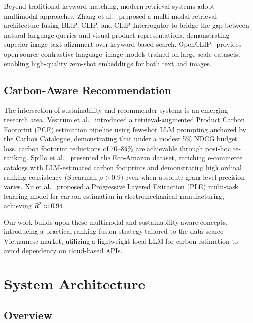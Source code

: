 \documentclass[conference]{IEEEtran}
\begin{document}
Beyond traditional keyword matching, modern retrieval systems adopt multimodal approaches. Zhang et al.~\cite{paper5} proposed a multi-modal retrieval architecture fusing BLIP, CLIP, and CLIP Interrogator to bridge the gap between natural language queries and visual product representations, demonstrating superior image-text alignment over keyword-based search. OpenCLIP~\cite{openclip} provides open-source contrastive language--image models trained on large-scale datasets, enabling high-quality zero-shot embeddings for both text and images.

\subsection{Carbon-Aware Recommendation}

The intersection of sustainability and recommender systems is an emerging research area. Vestrum et al.~\cite{carbon_reranking} introduced a retrieval-augmented Product Carbon Footprint (PCF) estimation pipeline using few-shot LLM prompting anchored by the Carbon Catalogue, demonstrating that under a modest 5\% NDCG budget loss, carbon footprint reductions of 70--86\% are achievable through post-hoc re-ranking. Spillo et al.~\cite{ecommerce_carbon} presented the Eco-Amazon dataset, enriching e-commerce catalogs with LLM-estimated carbon footprints and demonstrating high ordinal ranking consistency (Spearman $\rho > 0.9$) even when absolute gram-level precision varies. Xu et al.~\cite{carbon_estimation} proposed a Progressive Layered Extraction (PLE) multi-task learning model for carbon estimation in electromechanical manufacturing, achieving $R^2 \approx 0.94$.

Our work builds upon these multimodal and sustainability-aware concepts, introducing a practical ranking fusion strategy tailored to the data-scarce Vietnamese market, utilizing a lightweight local LLM for carbon estimation to avoid dependency on cloud-based APIs.

\section{System Architecture}

\subsection{Overview}
\end{document}
